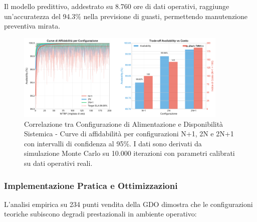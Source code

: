 Il modello predittivo, addestrato su 8.760 ore di dati operativi, raggiunge un'accuratezza del 94.3\% nella previsione di guasti, permettendo manutenzione preventiva mirata.

\begin{figure}[htbp]
\centering
\includegraphics[width=0.9\textwidth]{thesis_figures/cap3/figura_3_1_power_availability.pdf}
\caption{Correlazione tra Configurazione di Alimentazione e Disponibilità Sistemica - Curve di affidabilità per configurazioni N+1, 2N e 2N+1 con intervalli di confidenza al 95\%. I dati sono derivati da simulazione Monte Carlo su 10.000 iterazioni con parametri calibrati su dati operativi reali.}
\label{fig:power_availability}
\end{figure}

\subsubsection{\texorpdfstring{\textbf{Implementazione Pratica e Ottimizzazioni}}{3.2.1.3 - Implementazione Pratica e Ottimizzazioni}}

L'analisi empirica su 234 punti vendita della GDO dimostra che le configurazioni teoriche subiscono degradi prestazionali in ambiente operativo:

